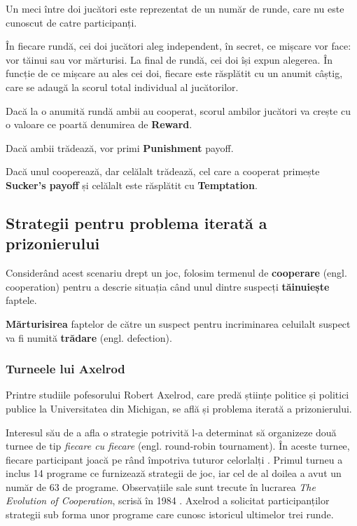 Un meci între doi jucători este reprezentat de un număr de runde, care nu este cunoscut de catre participanți.

În fiecare rundă, cei doi jucători aleg independent, în secret, ce mișcare vor face: vor tăinui sau vor mărturisi. La final de rundă, cei doi își expun alegerea. În funcție de ce mișcare au ales cei doi, fiecare este răsplătit cu un anumit câștig, care se adaugă la scorul total individual al jucătorilor. 

Dacă la o anumită rundă ambii au cooperat, scorul ambilor jucători va crește cu o valoare ce poartă denumirea de \textbf{Reward}. 

Dacă ambii trădează, vor primi \textbf{Punishment} payoff. 

Dacă unul cooperează, dar celălalt trădează, cel care a cooperat primește \textbf{Sucker's payoff} și celălalt este răsplătit cu \textbf{Temptation}. 

\subsection {Strategii pentru problema iterată a prizonierului}

Considerând acest scenariu drept un joc, folosim termenul de \textbf{cooperare} (engl. cooperation) pentru a descrie situația când unul dintre suspecți \textbf{tăinuiește} faptele. 

\textbf{Mărturisirea} faptelor de către un suspect pentru incriminarea celuilalt suspect va fi numită \textbf{trădare} (engl. defection). 

\subsubsection{Turneele lui Axelrod}

Printre studiile pofesorului Robert Axelrod, care predă științe politice și politici publice la Universitatea din Michigan, se află și problema iterată a prizonierului.

Interesul său de a afla o strategie potrivită l-a determinat să organizeze două turnee de tip \textit{fiecare cu fiecare} (engl. round-robin tournament). În aceste turnee, fiecare participant joacă pe rând împotriva tuturor celorlalți \cite{round_robin_dictionary}. Primul turneu a inclus 14 programe ce furnizează strategii de joc, iar cel de al doilea a avut un număr de 63 de programe. Observațiile sale sunt trecute în lucrarea \textit{The Evolution of Cooperation}, scrisă în 1984 \cite{article_by_melanie_mitchell}. Axelrod a solicitat participanților strategii sub forma unor programe care cunosc istoricul ultimelor trei runde.

